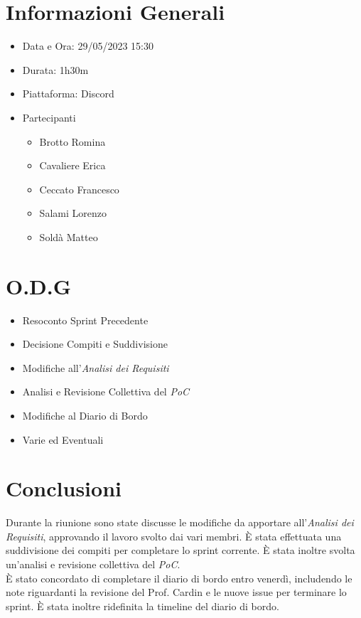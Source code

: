 \documentclass[a4paper, 12pt]{article}
\begin{document}
\makefrontpage

\section*{Informazioni Generali}
\begin{itemize}
    \item Data e Ora: 29/05/2023 15:30
    \item Durata: 1h30m
    \item Piattaforma: Discord
    \item Partecipanti
    \begin{itemize}
        \item Brotto Romina
        \item Cavaliere Erica
        \item Ceccato Francesco
        \item Salami Lorenzo
        \item Soldà Matteo
    \end{itemize}
\end{itemize}

\section*{O.D.G}
\begin{itemize}
    \item Resoconto Sprint Precedente
    \item Decisione Compiti e Suddivisione
    \item Modifiche all'\textit{Analisi dei Requisiti}
    \item Analisi e Revisione Collettiva del \textit{PoC}
    \item Modifiche al Diario di Bordo
    \item Varie ed Eventuali
\end{itemize}

\section*{Conclusioni}
Durante la riunione sono state discusse le modifiche da apportare all'\textit{Analisi dei Requisiti}, approvando il lavoro svolto dai vari membri. È stata effettuata una suddivisione dei compiti per completare lo sprint corrente. È stata inoltre svolta un'analisi e revisione collettiva del \textit{PoC}.\\
È stato concordato di completare il diario di bordo entro venerdì, includendo le note riguardanti la revisione del Prof. Cardin e le nuove issue per terminare lo sprint. È stata inoltre ridefinita la timeline del diario di bordo.
\end{document}
